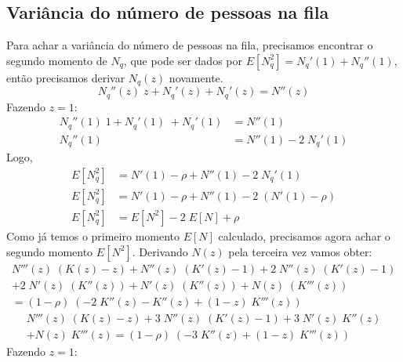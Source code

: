 \documentclass[a4paper]{article}
\newcommand{\E}[1]{E\!\left[#1\right]}
\begin{document}
\subsection{Variância do número de pessoas na fila}
Para achar a variância do número de pessoas na fila,
precisamos encontrar o segundo momento de \(N_q\),
que pode ser dados por \(E[N_q^2] = N_q'(1) + N_q''(1)\),
então precisamos derivar \(N_q(z)\) novamente.
\[
    N_q''(z) \; z + N_q'(z) + N_q'(z) = N''(z)
\]
Fazendo \(z = 1\):
\begin{align*}
    N_q''(1) \; 1 + N_q'(1) \; + N_q'(1) &= N''(1) \\
    N_q''(1) &= N''(1) - 2 \; N_q'(1)
\end{align*}
Logo,
\begin{align*}
    \E{N_q^2} &= N'(1) - \rho + N''(1) - 2 \; N_q'(1) \\
    \E{N_q^2} &= N'(1) - \rho + N''(1) - 2 \; (N'(1) - \rho) \\
    \E{N_q^2} &= \E{N^2} - 2 \; \E{N} + \rho
\end{align*}
Como já temos o primeiro momento \(\E{N}\) calculado,
precisamos agora achar o segundo momento \(\E{N^2}\).
Derivando \(N(z)\) pela terceira vez vamos obter:
\begin{align*}
    N'''(z) \; (K(z) - z) + N''(z) \; (K'(z) - 1)
        + 2 \; N''(z) \; (K'(z) - 1) \\
        + 2 \; N'(z) \; (K''(z)) + N'(z) \; (K''(z))
        + N(z) \; (K'''(z)) \\
        = (1 - \rho) \; (-2 \; K''(z) - K''(z)
        + (1 - z) \; K'''(z))
\end{align*} \begin{align*}
    N'''(z) \; (K(z) - z) + 3 \; N''(z) \; (K'(z) - 1)
        + 3 \; N'(z) \; K''(z) \\
        + N(z) \; K'''(z)
        = (1 - \rho) \; (-3 \; K''(z) + (1 - z) \; K'''(z))
\end{align*}
Fazendo \(z = 1\):
\end{document}
